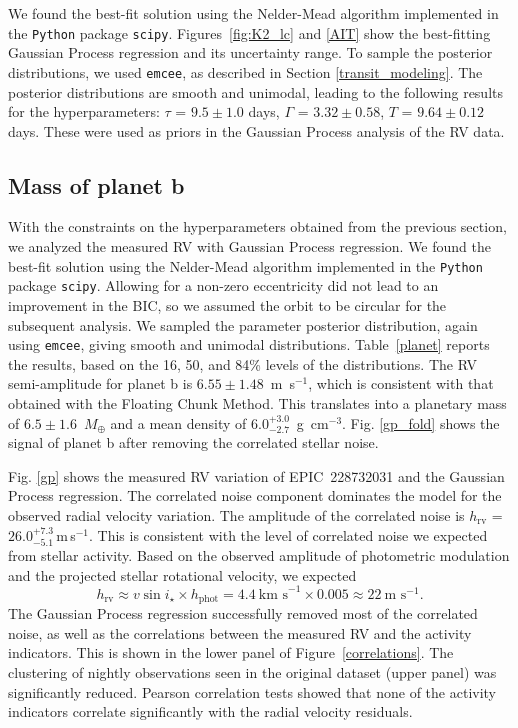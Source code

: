 \documentclass[twocolumn]{aastex61}
\begin{document}
We found the best-fit solution using the Nelder-Mead algorithm implemented in the {\tt Python} package {\tt scipy}. Figures~\ref{fig:K2_lc} and \ref{AIT} show the best-fitting Gaussian Process regression and its
uncertainty range. To sample the posterior distributions, we used {\tt emcee}, as described in Section \ref{transit_modeling}. The posterior distributions are smooth and unimodal, leading to the
following results for the hyperparameters: $\tau$ = $9.5 \pm 1.0$ days,  $\Gamma$ = $3.32 \pm 0.58$, $T$ = $9.64 \pm 0.12$ days.  These were used as priors in the Gaussian Process analysis of the RV data.



\subsection{Mass of planet b}
With the constraints on the hyperparameters obtained from the previous section, we analyzed the measured RV with Gaussian Process regression. We found the best-fit solution using the Nelder-Mead algorithm implemented in the {\tt Python} package {\tt scipy}. Allowing for a non-zero eccentricity did not lead to an improvement in the BIC,
so we assumed the orbit to be circular for the subsequent analysis. We sampled the parameter posterior distribution, again using {\tt emcee}, giving smooth and unimodal distributions. Table~\ref{planet} reports
the results, based on the 16, 50, and 84\% levels of the distributions. The RV semi-amplitude for planet b is $6.55 \pm 1.48$~m~s$^{-1}$, which is consistent with that obtained with the Floating Chunk Method.
This translates into a planetary mass of $6.5\pm1.6$~$M_{\oplus}$
and a mean density of $6.0^{+3.0}_{-2.7}$~g~cm$^{-3}$. Fig. \ref{gp_fold} shows the signal of planet b after
removing the correlated stellar noise.

Fig. \ref{gp} shows the measured RV variation of EPIC~228732031 and the Gaussian Process regression. The correlated noise component dominates the model for the
observed radial velocity variation. The amplitude of the correlated noise is $h_{\text{rv}}$ = $26.0^{+7.3}_{-5.1}$\,m\,s$^{-1}$. This is consistent with the level of correlated noise we expected from stellar
activity. Based on the observed amplitude of photometric modulation and the projected stellar rotational velocity, we expected
\begin{equation}
h_{\text{rv}} \approx v\sin i_\star \times h_{\text{phot}} = 4.4~\text{km s}^{-1} \times 0.005 \approx 22~\text{m s}^{-1}.
\end{equation}
The Gaussian Process regression successfully removed most of the correlated noise, as well as the correlations
between the measured RV and the activity indicators. This is shown in the lower panel of Figure~\ref{correlations}. The clustering of
nightly observations seen in the original dataset (upper panel)
was significantly reduced. Pearson correlation tests showed
that none of the activity indicators correlate significantly with
the radial velocity residuals.
\end{document}
